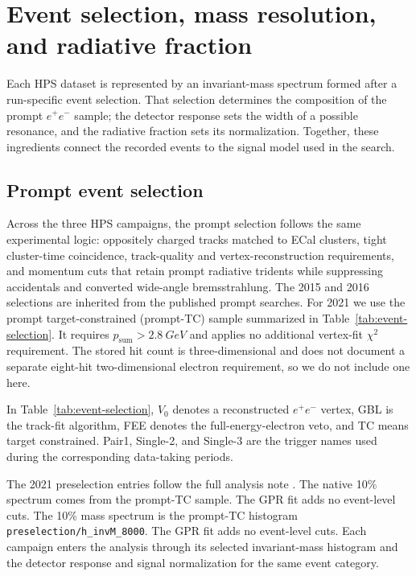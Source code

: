 \section{Event selection, mass resolution, and radiative fraction}
\label{sec:event-selection}

Each HPS dataset is represented by an invariant-mass spectrum formed after a
run-specific event selection. That selection determines the composition of the prompt $e^+e^-$ sample;
the detector response sets the width of a possible resonance, and the radiative
fraction sets its normalization. Together, these ingredients connect the recorded
events to the signal model used in the search.

\subsection{Prompt event selection}

Across the three HPS campaigns, the prompt selection follows the same experimental
logic:
oppositely charged tracks matched to ECal clusters, tight cluster-time coincidence,
track-quality and vertex-reconstruction requirements, and momentum cuts that retain
prompt radiative tridents while suppressing accidentals and converted wide-angle
bremsstrahlung. The 2015 and 2016 selections are inherited from the published prompt
searches. For 2021 we use the prompt target-constrained (prompt-TC) sample summarized in
Table~\ref{tab:event-selection}. It requires
$p_{\mathrm{sum}}>\SI{2.8}{GeV}$ and applies no additional vertex-fit $\chi^2$
requirement. The stored hit count is three-dimensional and does not document a separate
eight-hit two-dimensional electron requirement, so we do not include one here.

In Table~\ref{tab:event-selection}, $V_0$ denotes a reconstructed $e^+e^-$ vertex,
GBL is the track-fit algorithm, FEE denotes the full-energy-electron veto, and TC means
target constrained. Pair1, Single-2, and Single-3 are the trigger names used during the
corresponding data-taking periods.





The 2021 preselection entries follow the full analysis note
\cite[Sec.~4.8 and App.~A]{HPS2021FullAnalysisNote}.
\ifwritingsample
The native 10\% spectrum comes from the prompt-TC sample. The GPR fit adds no
event-level cuts.
\else
The 10\% mass spectrum is the prompt-TC histogram
\texttt{preselection/h\_invM\_8000}. The GPR fit adds no event-level cuts.
\fi
Each campaign enters the analysis through its selected invariant-mass histogram and
the detector response and signal normalization for the same event category.

